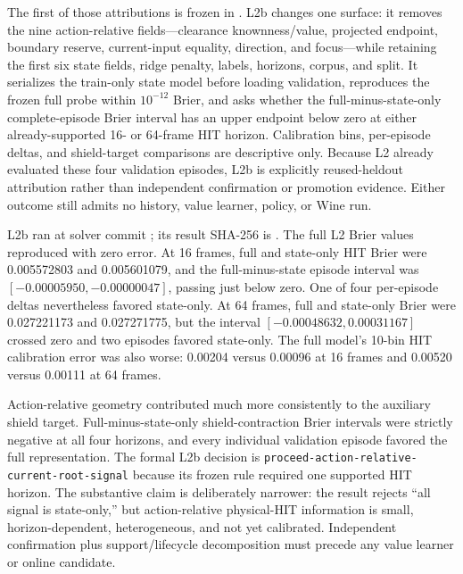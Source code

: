 \documentclass[11pt]{article}
\begin{document}
The first of those attributions is frozen in
.  L2b changes one surface:
it removes the nine action-relative fields---clearance knownness/value,
projected endpoint, boundary reserve, current-input equality, direction, and
focus---while retaining the first six state fields, ridge penalty, labels,
horizons, corpus, and split.  It serializes the train-only state model before
loading validation, reproduces the frozen full probe within $10^{-12}$ Brier,
and asks whether the full-minus-state-only complete-episode Brier interval has
an upper endpoint below zero at either already-supported 16- or 64-frame HIT
horizon.  Calibration bins, per-episode deltas, and shield-target comparisons
are descriptive only.  Because L2 already evaluated these four validation
episodes, L2b is explicitly reused-heldout attribution rather than independent
confirmation or promotion evidence.  Either outcome still admits no history,
value learner, policy, or Wine run.

L2b ran at solver commit
; its result SHA-256 is
.
The full L2 Brier values reproduced with zero error.  At 16 frames, full and
state-only HIT Brier were 0.005572803 and 0.005601079, and the full-minus-state
episode interval was $[-0.00005950,-0.00000047]$, passing just below zero.
One of four per-episode deltas nevertheless favored state-only.  At 64 frames,
full and state-only Brier were 0.027221173 and 0.027271775, but the interval
$[-0.00048632,0.00031167]$ crossed zero and two episodes favored state-only.
The full model's 10-bin HIT calibration error was also worse: 0.00204 versus
0.00096 at 16 frames and 0.00520 versus 0.00111 at 64 frames.

Action-relative geometry contributed much more consistently to the auxiliary
shield target.  Full-minus-state-only shield-contraction Brier intervals were
strictly negative at all four horizons, and every individual validation
episode favored the full representation.  The formal L2b decision is
\texttt{proceed-action-relative-current-root-signal} because its frozen rule
required one supported HIT horizon.  The substantive claim is deliberately
narrower: the result rejects ``all signal is state-only,'' but action-relative
physical-HIT information is small, horizon-dependent, heterogeneous, and not
yet calibrated.  Independent confirmation plus support/lifecycle decomposition
must precede any value learner or online candidate.
\end{document}
